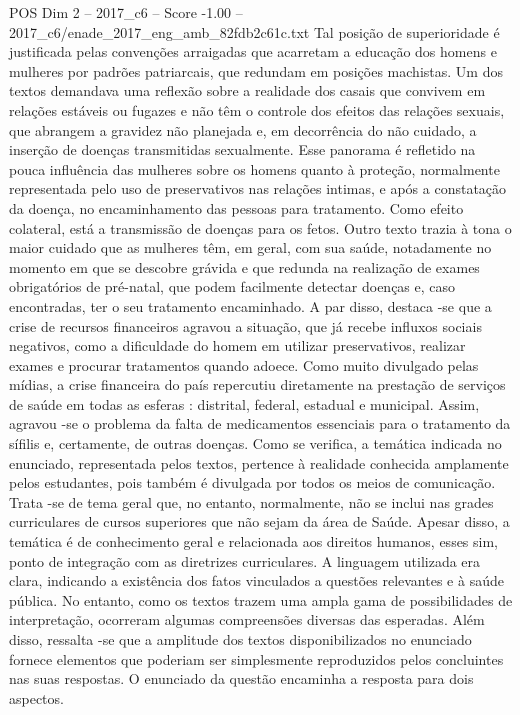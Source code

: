 \begin{textsample}{POS Dim 2 – 2017\_c6 – Score -1.00 – 2017\_c6/enade\_2017\_eng\_amb\_82fdb2c61c.txt}
Tal posição de superioridade é justificada pelas convenções arraigadas que acarretam a educação dos homens e mulheres por padrões patriarcais, que redundam em posições machistas.
Um dos textos demandava uma reflexão sobre a realidade dos casais que convivem em relações estáveis ou fugazes e não têm o controle dos efeitos das relações sexuais, que abrangem a gravidez não planejada e, em decorrência do não cuidado, a inserção de doenças transmitidas sexualmente.
Esse panorama é refletido na pouca influência das mulheres sobre os homens quanto à proteção, normalmente representada pelo uso de preservativos nas relações intimas, e após a constatação da doença, no encaminhamento das pessoas para tratamento.
Como efeito colateral, está a transmissão de doenças para os fetos.
Outro texto trazia à tona o maior cuidado que as mulheres têm, em geral, com sua saúde, notadamente no momento em que se descobre grávida e que redunda na realização de exames obrigatórios de pré-natal, que podem facilmente detectar doenças e, caso encontradas, ter o seu tratamento encaminhado.
A par disso, destaca -se que a crise de recursos financeiros agravou a situação, que já recebe influxos sociais negativos, como a dificuldade do homem em utilizar preservativos, realizar exames e procurar tratamentos quando adoece.
Como muito divulgado pelas mídias, a crise financeira do país repercutiu diretamente na prestação de serviços de saúde em todas as esferas : distrital, federal, estadual e municipal.
Assim, agravou -se o problema da falta de medicamentos essenciais para o tratamento da sífilis e, certamente, de outras doenças.
Como se verifica, a temática indicada no enunciado, representada pelos textos, pertence à realidade conhecida amplamente pelos estudantes, pois também é divulgada por todos os meios de comunicação.
Trata -se de tema geral que, no entanto, normalmente, não se inclui nas grades curriculares de cursos superiores que não sejam da área de Saúde.
Apesar disso, a temática é de conhecimento geral e relacionada aos direitos humanos, esses sim, ponto de integração com as diretrizes curriculares.
A linguagem utilizada era clara, indicando a existência dos fatos vinculados a questões relevantes e à saúde pública.
No entanto, como os textos trazem uma ampla gama de possibilidades de interpretação, ocorreram algumas compreensões diversas das esperadas.
Além disso, ressalta -se que a amplitude dos textos disponibilizados no enunciado fornece elementos que poderiam ser simplesmente reproduzidos pelos concluintes nas suas respostas.
O enunciado da questão encaminha a resposta para dois aspectos.

\end{textsample}
